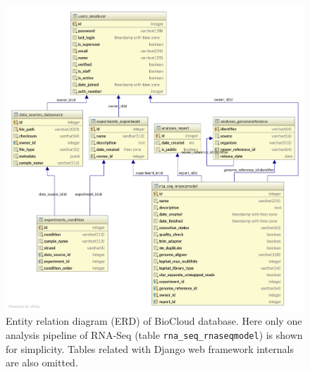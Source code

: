 \begin{figure}[htbp]
\centering
\includegraphics[width=\textwidth]{images/biocloud_erd}
\caption[Entity relation diagram (ERD) of BioCloud database]{
    Entity relation diagram (ERD) of BioCloud database. Here only one analysis
    pipeline of RNA-Seq (table \texttt{rna\_seq\_rnaseqmodel}) is shown for
    simplicity. Tables related with Django web framework internals are also
    omitted.
}
\label{fig:biocloud-erd}
\end{figure}
